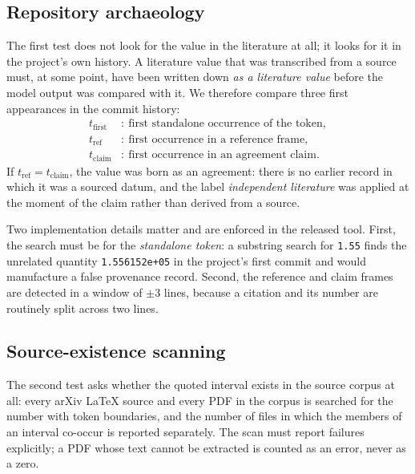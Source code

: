 \documentclass[11pt,a4paper]{article}
\begin{document}
\subsection{Repository archaeology}
The first test does not look for the value in the literature at all; it looks
for it in the project's own history. A literature value that was transcribed
from a source must, at some point, have been written down \emph{as a
literature value} before the model output was compared with it. We
therefore compare three first appearances in the commit history:
\begin{align}
t_{\mathrm{first}} &:\ \text{first standalone occurrence of the token},\\
t_{\mathrm{ref}} &:\ \text{first occurrence in a reference frame},\\
t_{\mathrm{claim}} &:\ \text{first occurrence in an agreement claim}.
\end{align}
If $t_{\mathrm{ref}} = t_{\mathrm{claim}}$, the value was born as an
agreement: there is no earlier record in which it was a sourced datum, and
the label \emph{independent literature} was applied at the moment of the
claim rather than derived from a source.

Two implementation details matter and are enforced in the released tool.
First, the search must be for the \emph{standalone token}: a substring
search for \texttt{1.55} finds the unrelated quantity \texttt{1.556152e+05}
in the project's first commit and would manufacture a false provenance
record. Second, the reference and claim frames are detected in a window of
$\pm3$ lines, because a citation and its number are routinely split across
two lines.

\subsection{Source-existence scanning}
The second test asks whether the quoted interval exists in the source corpus
at all: every arXiv LaTeX source and every PDF in the corpus is searched for
the number with token boundaries, and the number of files in which the
members of an interval co-occur is reported separately. The scan must
report failures explicitly; a PDF whose text cannot be extracted is counted
as an error, never as a zero.
\end{document}
